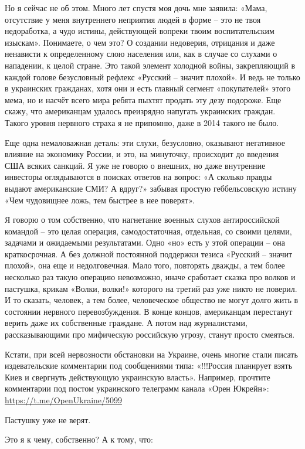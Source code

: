 Но я сейчас не об этом. Много лет спустя моя дочь мне заявила: «Мама,
отсутствие у меня внутреннего неприятия людей в форме – это не твоя
недоработка, а чудо истины, действующей вопреки твоим воспитательским изыскам».
Понимаете, о чем это? О создании недоверия, отрицания и даже ненависти к
определенному слою населения или, как в случае со слухами о нападении, к целой
стране. Это такой элемент холодной войны, закрепляющий в каждой голове
безусловный рефлекс «Русский – значит плохой». И ведь не только в украинских
гражданах, хотя они и есть главный сегмент «покупателей» этого мема, но и
насчёт всего мира ребята пыхтят продать эту дезу подороже. Еще скажу, что
американцам удалось преизрядно напугать украинских граждан. Такого уровня
нервного страха я не припомню, даже в 2014 такого не было.

Еще одна немаловажная деталь: эти слухи, безусловно, оказывают негативное
влияние на экономику России, и это, на минуточку, происходит до введения США
всяких санкций. Я уже не говорю о внешних, но даже внутренние инвесторы
оглядываются в поисках ответов на вопрос: «А сколько правды выдают американские
СМИ? А вдруг?» забывая простую геббельсовскую истину «Чем чудовищнее ложь, тем
быстрее в нее поверят».

Я говорю о том собственно, что нагнетание военных слухов антироссийской
командой – это целая операция, самодостаточная, отдельная, со своими целями,
задачами и ожидаемыми результатами. Одно «но» есть у этой операции – она
краткосрочная. А без должной постоянной поддержки тезиса «Русский – значит
плохой», она еще и недолговечная. Мало того, повторять дважды, а тем более
несколько раз такую операцию невозможно, иначе сработает сказка про волков и
пастушка, крикам «Волки, волки!» которого на третий раз уже никто не поверил. И
то сказать, человек, а тем более, человеческое общество не могут долго жить в
состоянии нервного перевозбуждения. В конце концов, американцам перестанут
верить даже их собственные граждане. А потом над журналистами, рассказывающими
про мифическую российскую угрозу, станут просто смеяться.

Кстати, при всей нервозности обстановки на Украине, очень многие стали писать
издевательские комментарии под сообщениями типа: «!!!Россия планирует взять
Киев и свергнуть действующую украинскую власть». Например, прочтите комментарии
под постом украинского телеграмм канала «Орен Юкрейн»:
\url{https://t.me/OpenUkraine/5099}

Пастушку уже не верят.

Это я к чему, собственно? А к тому, что:

